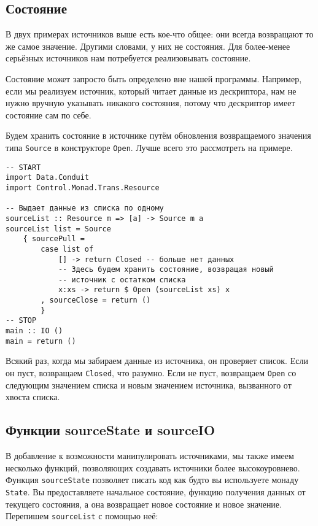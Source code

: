 \subsection{Состояние}
В двух примерах источников выше есть кое-что общее: они всегда возвращают то же самое
значение. Другими словами, у них не состояния. Для более-менее серьёзных источников нам
потребуется реализовывать состояние.
\begin{remark}
Состояние может запросто быть определено вне нашей программы. Например, если мы
реализуем источник, который читает данные из дескриптора, нам не нужно вручную
указывать никакого состояния, потому что дескриптор имеет состояние сам по себе.
\end{remark}
Будем хранить состояние в источнике путём обновления возвращаемого значения типа
\lstinline=Source= в конструкторе \lstinline=Open=. Лучше всего это рассмотреть на
примере.

\begin{lstlisting}
-- START
import Data.Conduit
import Control.Monad.Trans.Resource

-- Выдает данные из списка по одному
sourceList :: Resource m => [a] -> Source m a
sourceList list = Source
    { sourcePull =
        case list of
            [] -> return Closed -- больше нет данных
            -- Здесь будем хранить состояние, возвращая новый 
            -- источник с остатком списка
            x:xs -> return $ Open (sourceList xs) x
        , sourceClose = return ()
        }
-- STOP
main :: IO ()
main = return ()
\end{lstlisting}

Всякий раз, когда мы забираем данные из источника, он проверяет список. Если он пуст,
возвращаем \lstinline=Closed=, что разумно. Если не пуст, возвращаем \lstinline=Open= со
следующим значением
списка и новым значением источника, вызванного от хвоста списка.

\subsection{Функции sourceState и sourceIO}
В добавление к возможности манипулировать источниками, мы также имеем несколько функций,
позволяющих создавать источники более высокоуровнево. Функция \lstinline=sourceState=
позволяет писать
код как будто вы используете монаду \lstinline=State=. Вы предоставляете начальное
состояние,
функцию получения данных от текущего состояния, а она возвращает новое состояние и
новое значение. Перепишем \lstinline=sourceList= с помощью неё:

